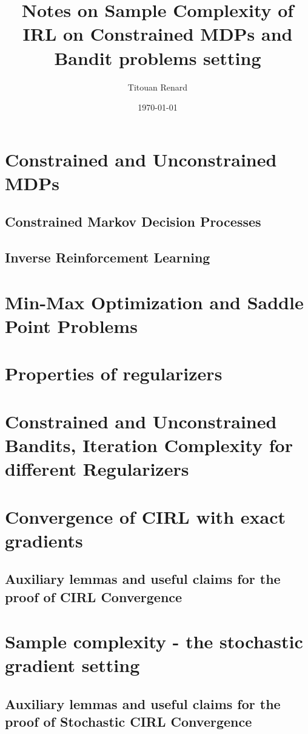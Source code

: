 \documentclass[11pt]{article}
\title{Notes on Sample Complexity of IRL on Constrained MDPs and Bandit problems setting}
\date{\today}
\author{Titouan Renard}
\numberwithin{equation}{section}
\begin{document}
\maketitle	

\tableofcontents

\section{Constrained and Unconstrained MDPs}


\newpage
\subsection{Constrained Markov Decision Processes} \label{sec:cmdps}


\newpage
\subsection{Inverse Reinforcement Learning} \label{sec:irl}


\newpage
\section{Min-Max Optimization and Saddle Point Problems}


\section{Properties of regularizers}


\newpage
\section{Constrained and Unconstrained Bandits, Iteration Complexity for different Regularizers}



% 


\newpage
\section{Convergence of CIRL with exact gradients}

\newpage
\subsection{Auxiliary lemmas and useful claims for the proof of CIRL Convergence}


\newpage
\section{Sample complexity - the stochastic gradient setting}

\newpage
\subsection{Auxiliary lemmas and useful claims for the proof of Stochastic CIRL Convergence}




\newpage
\printbibliography
\end{document}
